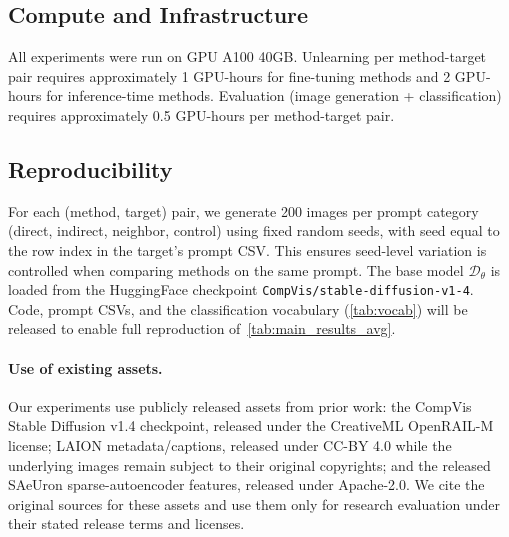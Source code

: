 \subsection{Compute and Infrastructure}
\label{app:compute}
All experiments were run on GPU A100 40GB. Unlearning per method-target pair requires approximately 1 GPU-hours for fine-tuning methods and 2 GPU-hours for inference-time methods. Evaluation (image generation + classification) requires approximately 0.5 GPU-hours per method-target pair.

\subsection{Reproducibility}
For each (method, target) pair, we generate 200 images per prompt category (direct, indirect, neighbor, control) using fixed random seeds, with seed equal to the row index in the target's prompt CSV. This ensures seed-level variation is controlled when comparing methods on the same prompt.
The base model $\mathcal{D}_\theta$ is loaded from the HuggingFace checkpoint \texttt{CompVis/stable-diffusion-v1-4}. Code, prompt CSVs, and the classification vocabulary (\cref{tab:vocab}) will be released to enable full reproduction of~\cref{tab:main_results_avg}.

\paragraph{Use of existing assets.}
Our experiments use publicly released assets from prior work: the CompVis Stable Diffusion v1.4 checkpoint, released under the CreativeML OpenRAIL-M license; LAION metadata/captions, released under CC-BY 4.0 while the underlying images remain subject to their original copyrights; and the released SAeUron sparse-autoencoder features, released under Apache-2.0. We cite the original sources for these assets and use them only for research evaluation under their stated release terms and licenses.